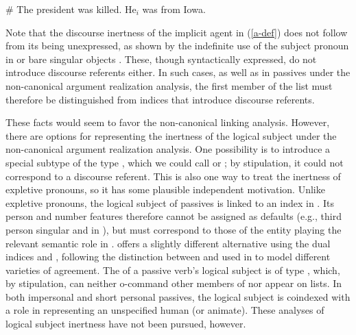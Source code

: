 \documentclass[output=paper
 	        ,biblatex
                ,babelshorthands
                ,newtxmath
                ,draftmode
                ,colorlinks, citecolor=brown
]{langscibook}
\begin{document}
\begin{exe}
\ex\label{a-def}
\# The president was killed. He$_{i}$ was from Iowa.
\end{exe}

Note that the discourse inertness of the implicit agent in (\ref{a-def}) does not follow from its being unexpressed, as shown by the indefinite use of the subject pronoun  in  \citep[241--244]{Koenig1998c} or  bare singular objects \citep[89--108]{FarkasandDeSwart2003}.
These, though syntactically expressed, do not introduce discourse referents either.
In such cases, as well as in passives under the non-canonical argument realization analysis, the first member of the \argst list must therefore be distinguished from indices that introduce discourse referents.

These facts would seem to favor the non-canonical linking analysis.
However, there are options for representing the inertness of the logical subject under the non-canonical argument realization analysis.
One possibility is to introduce a special subtype of the type , which we could call  or ; by stipulation, it could not correspond to a discourse referent.
This is also one way to treat the inertness of expletive pronouns, so it has some plausible independent motivation.
Unlike expletive pronouns, the logical subject of passives is linked to an index in .
Its person and number features therefore cannot be assigned as defaults (e.g., third person singular  and  in ), but must correspond to those of the entity playing the relevant semantic role in .
\citet[251--253]{Davis2001} offers a slightly different alternative using the dual indices  and , following the distinction between  and  used in \citet[240--250]{Kathol1999b} to model different varieties of agreement.
The  of a passive verb's logical subject is of type , which, by stipulation, can neither o-command other members of \argst nor appear on  lists.
In both impersonal and short personal passives, the logical subject is coindexed with a role in  representing an unspecified human (or animate).
These analyses of logical subject inertness have not been pursued, however.
\end{document}
